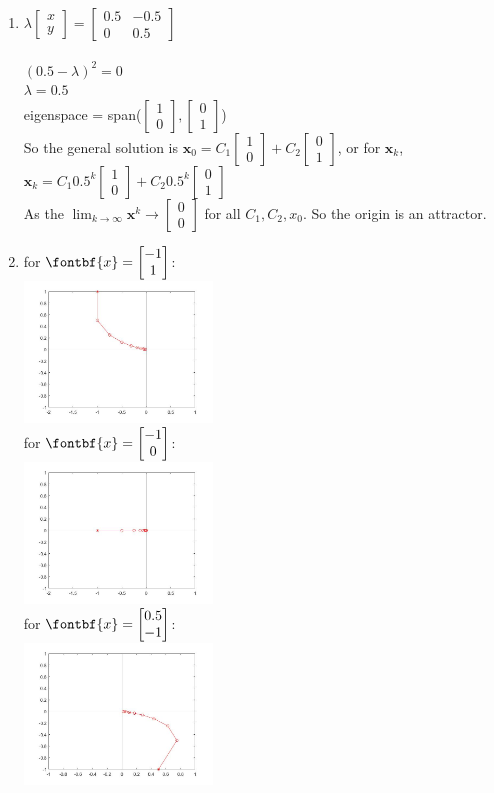 \documentclass{article}
\newcommand{\newVec}[2]{\begin{bmatrix}#1 \\ #2 \end{bmatrix}}
\newcommand{\newtt}[4]{\begin{bmatrix}#1 & #2\\ #3 & #4 \end{bmatrix}}
\begin{document}
\begin{enumerate}
\begin{enumerate}
    \item $\lambda \newVec{x}{y} = \newtt{0.5}{-0.5}{0}{0.5}$\\\\
    $(0.5 - \lambda)^2 = 0$\\
    $\lambda = 0.5$\\
    eigenspace = span($\newVec{1}{0}, \newVec{0}{1}$)\\
    So the general solution is $\textbf{x}_0 = C_1 \newVec{1}{0} + C_2 \newVec{0}{1}$, or for $\textbf{x}_k$,\\ $\textbf{x}_k = C_1 0.5^k\newVec{1}{0} + C_2 0.5^k\newVec{0}{1}$\\
    As the $\lim_{k\to\infty} \textbf{x}^k \rightarrow \newVec{0}{0}$ for all $C_1, C_2, x_0$. So the origin is an attractor.
    \item{
    for $\fontbf{x} = \newVec{-1}{1}$:\\ \includegraphics[width=50mm,scale=1]{Matlab3}\\
    for $\fontbf{x} = \newVec{-1}{0}$:\\
    \includegraphics[width=50mm,scale=1]{Matlab4}\\\newpage
    for $\fontbf{x} = \newVec{0.5}{-1}$:\\
    \includegraphics[width=50mm,scale=1]{Matlab5}\\
    }
    

\end{enumerate}
\end{enumerate}
\end{document}
